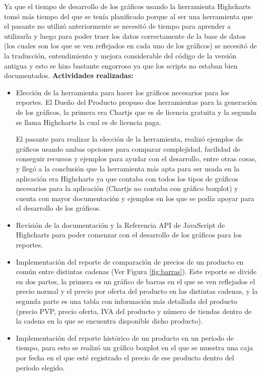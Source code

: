 Ya que el tiempo de desarrollo de los gráficos usando la herramienta Highcharts tomó más tiempo del que se tenía planificado porque al ser una herramienta que el pasante no utilizó anteriormente se necesitó de tiempo para aprender a utilizarla y luego para poder traer los datos correctamente de la base de datos (los cuales son los que se ven reflejados en cada uno de los gráficos) se necesitó de la traducción, entendimiento y mejora considerable del código de la versión antigua y esto se hizo bastante engorroso ya que los scripts no estaban bien documentados.
\vskip 0.5cm
\textbf{Actividades realizadas:}
\begin{itemize}
  \item Elección de la herramienta para hacer los gráficos necesarios para los reportes. El Dueño del Producto propuso dos herramientas para la generación de los gráficos, la primera era Chartjs que es de licencia gratuita y la segunda se llama Highcharts la cual es de licencia paga. 
  
  El pasante para realizar la elección de la herramienta, realizó ejemplos de gráficos usando ambas opciones para comparar complejidad, facilidad de conseguir recursos y ejemplos para ayudar con el desarrollo, entre otras cosas, y llegó a la conclusión que la herramienta más apta para ser usada en la aplicación era Highcharts ya que contaba con todos los tipos de gráficos necesarios para la aplicación (Chartjs no contaba con gráfico boxplot) y cuenta con mayor documentación y ejemplos en los que se podía apoyar para el desarrollo de los gráficos.
  \item Revisión de la documentación y la Referencia API de JavaScript de Highcharts para poder comenzar con el desarrollo de los gráficos para los reportes.
  \item Implementación del reporte de comparación de precios de un producto en común entre distintas cadenas (Ver Figura \ref{fig:barras}). Este reporte se divide en dos partes, la primera es un gráfico de barras en el que se ven reflejados el precio normal y el precio por oferta del producto en las distintas cadenas, y la segunda parte es una tabla con información más detallada del producto (precio PVP, precio oferta, IVA del producto y número de tiendas dentro de la cadena en la que se encuentra disponible dicho producto).
  
  \item Implementación del reporte histórico de un producto en un período de tiempo, para esto se realizó un gráfico boxplot en el que se muestra una caja por fecha en el que esté registrado el precio de ese producto dentro del período elegido.
\end{itemize}

